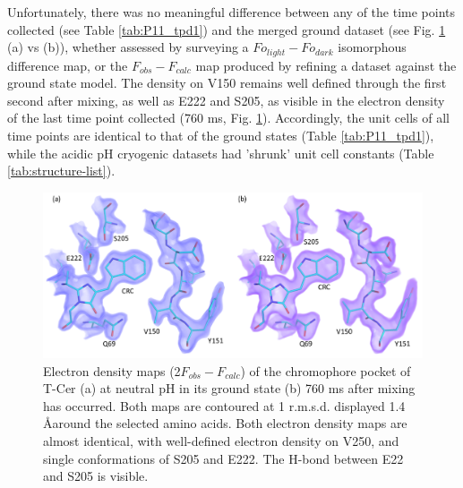 Unfortunately, there was no meaningful difference between any of the time points collected (see Table \ref{tab:P11_tpd1}) and the merged ground dataset (see Fig. \ref{fig:tpd1} (a) vs (b)), whether assessed by surveying a \(Fo _{light} - Fo_{dark}\) isomorphous difference map, or the \(F_{obs} - F_{calc}\) map produced by refining a dataset against the ground state model. The density on V150 remains well defined through the first second after mixing, as well as E222 and S205, as visible in the electron density of the last time point collected (760 ms, Fig. \ref{fig:tpd1}). Accordingly, the unit cells of all time points are identical to that of the ground states (Table \ref{tab:P11_tpd1}), while the acidic pH cryogenic datasets had 'shrunk' unit cell constants (Table \ref{tab:structure-list}).

\begin{figure}[H] %
    \centering
        \noindent \includegraphics[width=\textwidth]{images/T-Cer/P11_1_volumes.pdf}
    \hfill
    \caption{Electron density maps (2\(F_{obs} - F_{calc}\)) of the chromophore pocket of T-Cer (a) at neutral pH in its ground state (b) 760 ms after mixing has occurred. Both maps are contoured at 1 r.m.s.d. displayed 1.4 \AA  around the selected amino acids. Both electron density maps are almost identical, with well-defined electron density on V250, and single conformations of S205 and E222. The H-bond between E22 and S205 is visible.}
    \label{fig:tpd1}
\end{figure}

